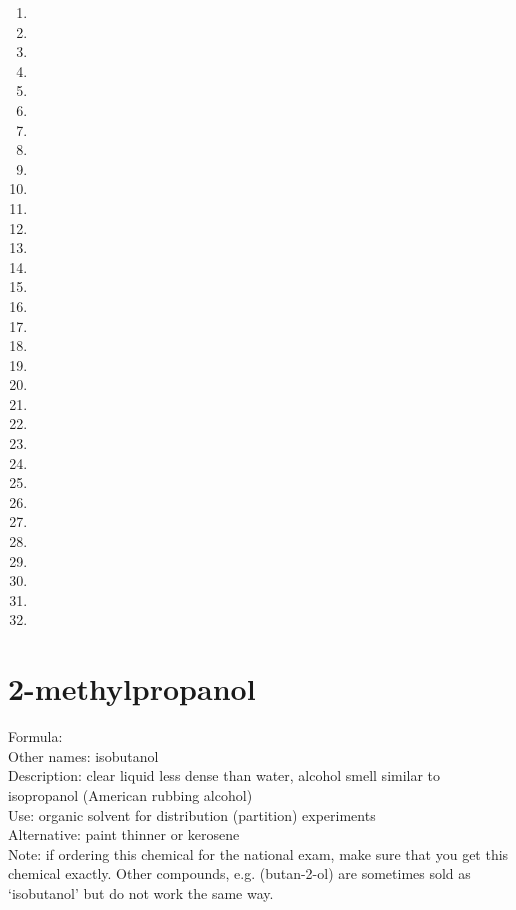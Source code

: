 \begin{enumerate}
\item {}
\item {}
\item {}
\item {}
\item {}
\item {}
\item {}
\item {}
\item {}
\item {}
\item {}
\item {}
\item {}
\item {}
\item {}
\item {}
\item {}
\item {}
\item {}
\item {}
\item {}
\item {}
\item {}
\item {}
\item {}
\item {}
\item {}
\item {}
\item {}
\item {}
\item {}
\item {}
\end{enumerate}

\section{2-methylpropanol}
\label{sec:methylpropanol}
Formula: \\
Other names: isobutanol\\
Description: clear liquid less dense than water, 
alcohol smell similar to isopropanol (American rubbing alcohol)\\
Use: organic solvent for distribution (partition) experiments\\
Alternative: paint thinner or kerosene\\
Note: if ordering this chemical for the national exam, 
make sure that you get this chemical exactly. 
Other compounds, 
e.g. 
 (butan-2-ol) are sometimes sold 
as ‘isobutanol’ but do not work the same way.

